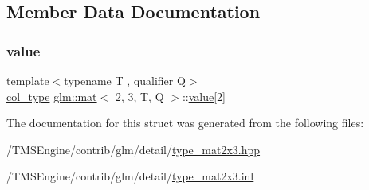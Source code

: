 \subsection{Member Data Documentation}
\mbox{\label{structglm_1_1mat_3_012_00_013_00_01_t_00_01_q_01_4_a6ffb5e68032090a7980ff22e64eff8cf}} 
\subsubsection{\texorpdfstring{value}{value}}
{\footnotesize\ttfamily template$<$typename T , qualifier Q$>$ \\
\hyperlink{structglm_1_1mat_3_012_00_013_00_01_t_00_01_q_01_4_aebe4faf14ea1bc3092b4bbf591d7194e}{col\+\_\+type} \hyperlink{structglm_1_1mat}{glm\+::mat}$<$ 2, 3, T, Q $>$\+::\hyperlink{_s_d_l__opengl__glext_8h_a8ad81492d410ff2ac11f754f4042150f}{value}\mbox{[}2\mbox{]}\hspace{0.3cm}{\ttfamily [private]}}



The documentation for this struct was generated from the following files\+:\begin{DoxyCompactItemize}
\item 
/\+T\+M\+S\+Engine/contrib/glm/detail/\hyperlink{type__mat2x3_8hpp}{type\+\_\+mat2x3.\+hpp}\item 
/\+T\+M\+S\+Engine/contrib/glm/detail/\hyperlink{type__mat2x3_8inl}{type\+\_\+mat2x3.\+inl}\end{DoxyCompactItemize}
